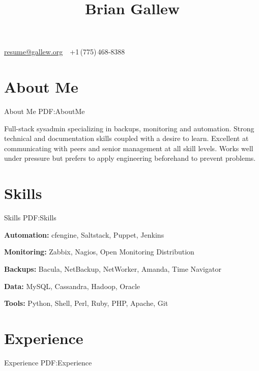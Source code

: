 \documentclass[letterpaper,10pt,oneside]{article}
\begin{document}

\title{Brian Gallew}

\begin{subtitle}
\par
\href{mailto:resume@gallew.org}
{resume@gallew.org}
\,\BulletSymbol\,
+1\,(775)\,468-8388
\end{subtitle}

\begin{body}


\section
{About Me}
{About Me}
{PDF:AboutMe}

Full-stack sysadmin specializing in backups, monitoring and automation.
Strong technical and documentation skills coupled with a desire to learn.
Excellent at communicating with peers and senior management at all skill
levels.  Works well under pressure but prefers to apply engineering
beforehand to prevent problems.


\section
{Skills}
{Skills}
{PDF:Skills}

\textbf{Automation:}
cfengine, Saltstack, Puppet, Jenkins
\SmallEntryGap

\textbf{Monitoring:}
Zabbix, Nagios, Open Monitoring Distribution
\SmallEntryGap

\textbf{Backups:}
Bacula, NetBackup, NetWorker, Amanda, Time Navigator
\SmallEntryGap

\textbf{Data:}
MySQL, Cassandra, Hadoop, Oracle
\SmallEntryGap

\textbf{Tools:}
Python, Shell, Perl, Ruby, PHP, Apache, Git
\SmallEntryGap


\section
{Experience}
{Experience}
{PDF:Experience}


\end{body}
\end{document}
